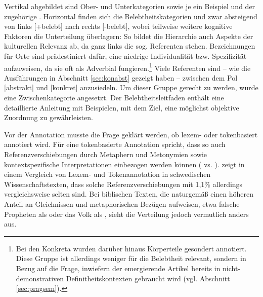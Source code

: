 Vertikal abgebildet sind Ober- und Unterkategorien sowie je ein Beispiel und der zugehörige . Horizontal finden sich die Belebtheitskategorien und zwar absteigend von links [+belebt] nach rechts [-belebt],  wobei teilweise weitere kognitive Faktoren die Unterteilung überlagern: So bildet die Hierarchie auch Aspekte der kulturellen Relevanz ab, da ganz links die sog.  Referenten stehen. Bezeichnungen für Orte sind prädestiniert dafür, eine niedrige Individualität bzw. Spezifizität aufzuweisen, da sie oft als Adverbial fungieren.\footnote{Bei den Konkreta wurden darüber hinaus Körperteile gesondert annotiert. Diese Gruppe ist allerdings weniger für die Belebtheit relevant, sondern in Bezug auf die Frage, inwiefern der emergierende Artikel bereits in nicht-demonstrativen Definitheitskontexten gebraucht wird (vgl. Abschnitt \ref{sec:pragsem}).} Viele Referenten sind -- wie die Ausführungen in Abschnitt \ref{sec:konabst} gezeigt haben -- zwischen dem Pol [abstrakt] und [konkret] anzusiedeln. Um dieser Gruppe gerecht zu werden, wurde eine Zwischenkategorie angesetzt. Der Belebtheitsleitfaden enthält eine detaillierte Anleitung mit Beispielen, mit dem Ziel, eine möglichst objektive Zuordnung zu gewährleisten.

Vor der Annotation musste die Frage geklärt werden, ob lexem- oder tokenbasiert annotiert wird. Für eine tokenbasierte Annotation spricht, dass so auch Referenzverschiebungen durch Metaphern und Metonymien sowie kontextspezifische Interpretationen einbezogen werden können ( vs. ). \textcite{Ovrelid2009} zeigt in einem Vergleich von Lexem- und Tokenannotation in schwedischen Wissenschaftstexten, dass solche Referenzverschiebungen mit 1,1\%  allerdings vergleichsweise selten sind.  Bei biblischen Texten, die naturgemäß einen höheren Anteil an Gleichnissen und metaphorischen Bezügen aufweisen, etwa falsche Propheten als  oder das Volk als , sieht die Verteilung jedoch vermutlich anders aus. 

